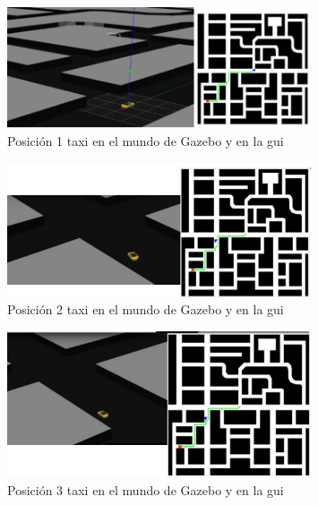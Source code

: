 \begin{figure}[H]
  \begin{center}
    \includegraphics[width=0.8\textwidth]{figures/GPP/camino1_G.png}
		\caption{Posición 1 taxi en el mundo de Gazebo y en la \acrshort{gui}}
		\label{fig.camino1_G_gpp}
		\end{center}
\end{figure}

\begin{figure}[H]
  \begin{center}
    \includegraphics[width=0.8\textwidth]{figures/GPP/camino2_G.png}
		\caption{Posición 2 taxi en el mundo de Gazebo y en la \acrshort{gui}}
		\label{fig.camino2_G_gpp}
		\end{center}
\end{figure}

\begin{figure}[H]
  \begin{center}
    \includegraphics[width=0.8\textwidth]{figures/GPP/camino3_G.png}
		\caption{Posición 3 taxi en el mundo de Gazebo y en la \acrshort{gui}}
		\label{fig.camino3_G_gpp}
		\end{center}
\end{figure}

